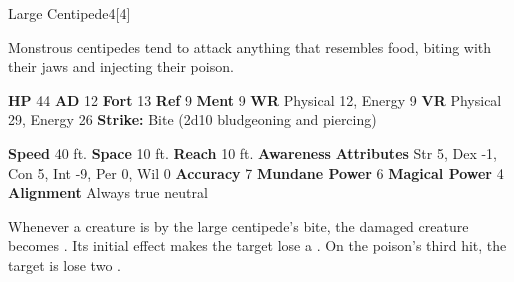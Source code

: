   \begin{monsection}{Large Centipede}{4}[4]
    \vspace{-1em}\vspace{-1em}
    \vspace{0em}

    
    Monstrous centipedes tend to attack anything that resembles food, biting with their jaws and injecting their poison.
  
    

    \begin{spellcontent}
      \begin{spelltargetinginfo}
        \pari \textbf{HP} 44 \monsep
          \textbf{AD} 12 \monsep
          \textbf{Fort} 13 \monsep
          \textbf{Ref} 9 \monsep
          \textbf{Ment} 9
        \pari \textbf{WR} Physical 12, Energy 9 \monsep
        \textbf{VR} Physical 29, Energy 26
        \pari \textbf{Strike:}
            Bite  (2d10 bludgeoning and piercing)
      \end{spelltargetinginfo}
    \end{spellcontent}
    \begin{monsterfooter}
      \pari \textbf{Speed} 40 ft. \monsep
        \textbf{Space} 10 ft. \monsep
        \textbf{Reach} 10 ft.
      \pari \textbf{Awareness} 
      \pari \textbf{Attributes}
        Str 5, Dex -1,
        Con 5, Int -9,
        Per 0, Wil 0
      \pari \textbf{Accuracy} 7 \monsep
        \textbf{Mundane Power} 6 \monsep
      \textbf{Magical Power} 4
      \pari \textbf{Alignment} Always true neutral
    \end{monsterfooter}
  \end{monsection}
    Whenever a creature is  by the large centipede's bite,
      the damaged creature becomes .
    Its initial effect makes the target lose a .
    On the poison's third hit, the target is lose two .
  
